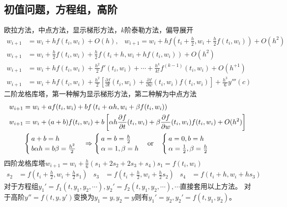 \documentclass[twocolumn]{article}
\begin{document}
\subsection{初值问题，方程组，高阶}
欧拉方法，中点方法，显示梯形方法，$k$阶泰勒方法，偏导展开
\begin{align*}
    w_{i+1} & =w_i+hf(t_i,w_i)+O(h),\,\,\,\,\, w_{i+1}=w_i+hf\left(t_i+\frac{h}{2},w_i+\frac{h}{2}f(t_i,w_i)\right)+O(h^2)                                            \\
    w_{i+1} & =w_{i}+\frac{h}{2}f(t_i,w_i)+\frac{h}{2}f\left(t_i+h,w_i+hf(t_i,w_i)\right)+O(h^2)                                                                 \\
    w_{i+1} & =w_i+hf(t_i,w_i)+\frac{h^2}{2}f'(t_i,w_i)+\cdots+\frac{h^k}{k!}f^{(k-1)}(t_i,w_i)+O(h^{+1})                                                           \\
    w_{i+1} & =w_i+hf(t_i,w_i)+\frac{h^2}{2}\left[ \frac{\partial f}{\partial t}(t_i,w_i)+\frac{\partial f}{\partial w}(t_i,w_i)f(t_i,w_i) \right]+\frac{h^3}{6}y'''(c)
\end{align*}
二阶龙格库塔，第一种解为显示梯形方法，第二种解为中点方法
\begin{align*}
    w_{i+1} & =w_i+af(t_i,w_i)+bf\left(t_i+\alpha h,w_i+\beta f(t_i,w_i)\right)                                                           \\
    w_{i+1} & =w_i+(a+b)f(t_i,w_i)+b\left[ \alpha h\frac{\partial f}{\partial t}(t_i,w_i)+\beta\frac{\partial f}{\partial w}(t_i,w_i)f(t_i,w_i)+O(h^2) \right] \\
            &
    \begin{cases}
        a+b=h \\
        b\alpha h=b\beta=\frac{h^2}{2}
    \end{cases}
    \Rightarrow
    \begin{cases}
        a=b=\frac{h}{2} \\
        \alpha=1,\beta=h
    \end{cases}
    \text{or\quad}
    \begin{cases}
        a=0,b=h \\
        \alpha=\frac{1}{2},\beta=\frac{h}{2}
    \end{cases}
\end{align*}
四阶龙格库塔\qquad$w_{i+1}=w_i+\frac{h}{6}(s_1+2s_2+2s_3+s_4)$\qquad$s_1=f(t_i,w_i)$
\begin{align*}
    s_2 & =f\left( t_i+\frac{h}{2},w_i+\frac{h}{2}s_1 \right) & s_3 & =f\left( t_i+\frac{h}{2},w_i+\frac{h}{2}s_2 \right) & s_4 & =f\left( t_i+h,w_i+hs_3 \right)
\end{align*}
对于方程组$y_1'=f_1(t,y_1,y_2,\cdots),y_2'=f_2(t,y_1,y_2,\cdots),\cdots$直接套用以上方法。
\newline
对于高阶$y''=f(t,y,y')$变换为$y_1=y,y_2=y$则有$y_1'=y_2,y_2'=f(t,y_1,y_2)$。
\end{document}
